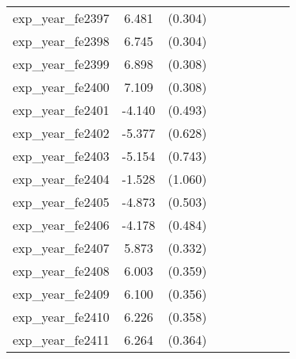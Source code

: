 {\begin{tabular}{l*{4}{cc}}
exp\_year\_fe2397&    6.481\sym{***}&  (0.304)&                  &         &                  &         &                  &         \\
exp\_year\_fe2398&    6.745\sym{***}&  (0.304)&                  &         &                  &         &                  &         \\
exp\_year\_fe2399&    6.898\sym{***}&  (0.308)&                  &         &                  &         &                  &         \\
exp\_year\_fe2400&    7.109\sym{***}&  (0.308)&                  &         &                  &         &                  &         \\
exp\_year\_fe2401&   -4.140\sym{***}&  (0.493)&                  &         &                  &         &                  &         \\
exp\_year\_fe2402&   -5.377\sym{***}&  (0.628)&                  &         &                  &         &                  &         \\
exp\_year\_fe2403&   -5.154\sym{***}&  (0.743)&                  &         &                  &         &                  &         \\
exp\_year\_fe2404&   -1.528         &  (1.060)&                  &         &                  &         &                  &         \\
exp\_year\_fe2405&   -4.873\sym{***}&  (0.503)&                  &         &                  &         &                  &         \\
exp\_year\_fe2406&   -4.178\sym{***}&  (0.484)&                  &         &                  &         &                  &         \\
exp\_year\_fe2407&    5.873\sym{***}&  (0.332)&                  &         &                  &         &                  &         \\
exp\_year\_fe2408&    6.003\sym{***}&  (0.359)&                  &         &                  &         &                  &         \\
exp\_year\_fe2409&    6.100\sym{***}&  (0.356)&                  &         &                  &         &                  &         \\
exp\_year\_fe2410&    6.226\sym{***}&  (0.358)&                  &         &                  &         &                  &         \\
exp\_year\_fe2411&    6.264\sym{***}&  (0.364)&                  &         &                  &         &                  &         \\

\end{tabular}}
